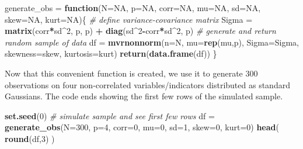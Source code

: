 \documentclass[
  man,floatsintext]{apa7}
\newenvironment{Shaded}{\begin{snugshade}}{\end{snugshade}}
\newcommand{\AttributeTok}[1]{\textcolor[rgb]{0.13,0.29,0.53}{#1}}
\newcommand{\CommentTok}[1]{\textcolor[rgb]{0.56,0.35,0.01}{\textit{#1}}}
\newcommand{\ConstantTok}[1]{\textcolor[rgb]{0.56,0.35,0.01}{#1}}
\newcommand{\ControlFlowTok}[1]{\textcolor[rgb]{0.13,0.29,0.53}{\textbf{#1}}}
\newcommand{\DecValTok}[1]{\textcolor[rgb]{0.00,0.00,0.81}{#1}}
\newcommand{\FunctionTok}[1]{\textcolor[rgb]{0.13,0.29,0.53}{\textbf{#1}}}
\newcommand{\NormalTok}[1]{#1}
\newcommand{\OtherTok}[1]{\textcolor[rgb]{0.56,0.35,0.01}{#1}}
\newcommand{\SpecialCharTok}[1]{\textcolor[rgb]{0.81,0.36,0.00}{\textbf{#1}}}
\begin{document}
\begin{Shaded}
\begin{Highlighting}[]
\NormalTok{generate\_obs }\OtherTok{=} \ControlFlowTok{function}\NormalTok{(}\AttributeTok{N=}\ConstantTok{NA}\NormalTok{, }\AttributeTok{p=}\ConstantTok{NA}\NormalTok{, }\AttributeTok{corr=}\ConstantTok{NA}\NormalTok{, }\AttributeTok{mu=}\ConstantTok{NA}\NormalTok{, }\AttributeTok{sd=}\ConstantTok{NA}\NormalTok{, }\AttributeTok{skew=}\ConstantTok{NA}\NormalTok{, }\AttributeTok{kurt=}\ConstantTok{NA}\NormalTok{)\{}
    \CommentTok{\# define variance{-}covariance matrix}
\NormalTok{    Sigma }\OtherTok{=} \FunctionTok{matrix}\NormalTok{(corr}\SpecialCharTok{*}\NormalTok{sd}\SpecialCharTok{\^{}}\DecValTok{2}\NormalTok{, p, p) }\SpecialCharTok{+} \FunctionTok{diag}\NormalTok{(sd}\SpecialCharTok{\^{}}\DecValTok{2}\SpecialCharTok{{-}}\NormalTok{corr}\SpecialCharTok{*}\NormalTok{sd}\SpecialCharTok{\^{}}\DecValTok{2}\NormalTok{, p)}
    \CommentTok{\# generate and return random sample of data}
\NormalTok{    df }\OtherTok{=} \FunctionTok{mvrnonnorm}\NormalTok{(}\AttributeTok{n=}\NormalTok{N, }\AttributeTok{mu=}\FunctionTok{rep}\NormalTok{(mu,p), }\AttributeTok{Sigma=}\NormalTok{Sigma, }\AttributeTok{skewness=}\NormalTok{skew, }\AttributeTok{kurtosis=}\NormalTok{kurt)}
    \FunctionTok{return}\NormalTok{(}\FunctionTok{data.frame}\NormalTok{(df))}
\NormalTok{\}}
\end{Highlighting}
\end{Shaded}

Now that this convenient function is created, we use it to generate 300 observations on four non-correlated variables/indicators distributed as standard Gaussians. The code ends showing the first few rows of the simulated sample.

\begin{Shaded}
\begin{Highlighting}[]
\FunctionTok{set.seed}\NormalTok{(}\DecValTok{0}\NormalTok{)}
\CommentTok{\# simulate sample and see first few rows}
\NormalTok{df }\OtherTok{=} \FunctionTok{generate\_obs}\NormalTok{(}\AttributeTok{N=}\DecValTok{300}\NormalTok{, }\AttributeTok{p=}\DecValTok{4}\NormalTok{, }\AttributeTok{corr=}\DecValTok{0}\NormalTok{, }\AttributeTok{mu=}\DecValTok{0}\NormalTok{, }\AttributeTok{sd=}\DecValTok{1}\NormalTok{, }\AttributeTok{skew=}\DecValTok{0}\NormalTok{, }\AttributeTok{kurt=}\DecValTok{0}\NormalTok{)}
\FunctionTok{head}\NormalTok{( }\FunctionTok{round}\NormalTok{(df,}\DecValTok{3}\NormalTok{) )}
\end{Highlighting}
\end{Shaded}
\end{document}
